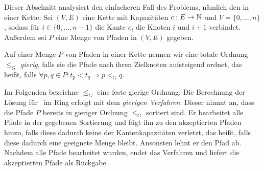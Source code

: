 Dieser Abschnitt analysiert den einfacheren Fall des Problems, nämlich den in einer Kette:
Sei $(V,E)$ eine Kette mit Kapazitäten $c: E \to \mathbb N$ und $V=\{0,\dots,n\}$, sodass für $i \in \{0,\dots,n-1\}$
die Kante $e_i$ die Knoten $i$ und $i+1$ verbindet.
Außerdem sei $P$ eine Menge von Pfaden in $(V,E)$ gegeben.
\begin{definition}
    Auf einer Menge $P$ von Pfaden in einer Kette nennen wir eine totale Ordnung $\leq_G$ {\em gierig},
    falls sie die Pfade nach ihren Zielknoten aufsteigend ordnet, das heißt, falls
    $\forall p, q \in P \colon t_p < t_q \Rightarrow p <_G q$.
\end{definition}
Im Folgenden bezeichne $\leq_G$ eine feste gierige Ordnung.
Die Berechnung der Lösung für \CallControl\ im Ring erfolgt mit dem {\em gierigen Verfahren}: 
Dieser nimmt an, dass die Pfade $P$ bereits in gieriger Ordnung $\leq_G$ sortiert sind.
Er bearbeitet alle Pfade in der gegebenen Sortierung und fügt ihn zu den akzeptierten Pfaden hinzu, falls diese 
dadurch keine der Kantenkapazitäten verletzt, das heißt, falls diese dadurch eine geeignete Menge bleibt.
Ansonsten lehnt er den Pfad ab.
Nachdem alle Pfade bearbeitet wurden, endet das Verfahren und liefert die akzeptierten Pfade als Rückgabe.

